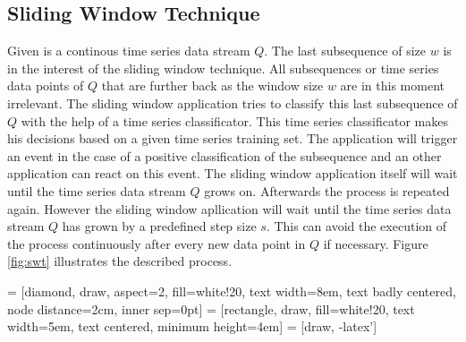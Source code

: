 \subsection{Sliding Window Technique} \label{sliding_window_technique}
Given is a continous time series data stream $Q$. The last subsequence of size $w$ is in the interest of the sliding
window technique. All subsequences or time series data points of $Q$ that are further back as the window size $w$ are in
this moment irrelevant. The sliding window application tries to classify this last subsequence of $Q$ with the help of a
time series classificator. This time series classificator makes his decisions based on a given time series training set.
The application will trigger an event in the case of a positive classification of the subsequence and an other
application can react on this event. The sliding window application itself will wait until the time series data stream
$Q$ grows on. Afterwards the process is repeated again. However the sliding window apllication will wait until the time
series data stream $Q$ has grown by a predefined step size $s$. This can avoid the execution of the process continuously
after every new data point in $Q$ if necessary. Figure \ref{fig:swt} illustrates the described process.

 = [diamond, draw, aspect=2, fill=white!20, text width=8em, text badly centered, node distance=2cm, inner sep=0pt]
 = [rectangle, draw, fill=white!20, text width=5em, text centered, minimum height=4em]
 = [draw, -latex']

